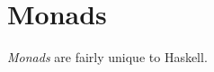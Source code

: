 \section{Monads}\label{sec:Monads}
\begin{definition}[Monad]\label{def:Monad}
  \emph{Monads} are fairly unique to Haskell.
\end{definition}

